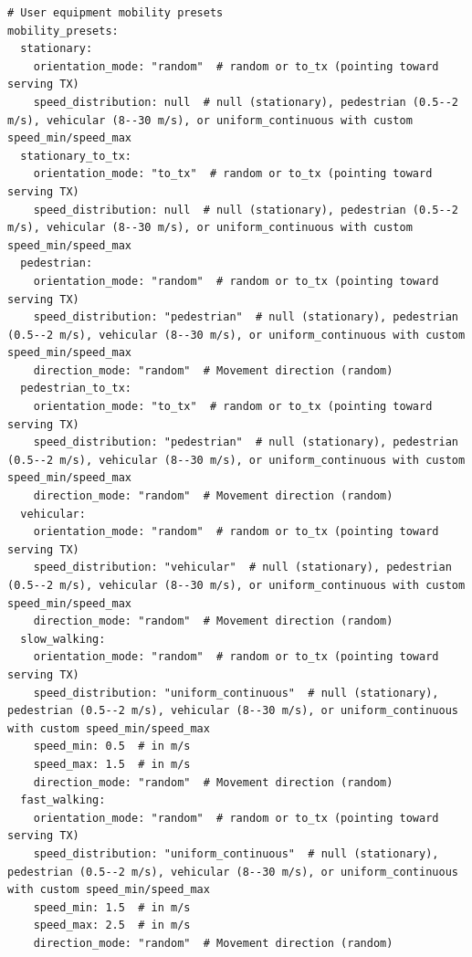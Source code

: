 \documentclass{article}
\begin{document}
\begin{verbatim}
# User equipment mobility presets
mobility_presets:
  stationary:
    orientation_mode: "random"  # random or to_tx (pointing toward serving TX)
    speed_distribution: null  # null (stationary), pedestrian (0.5--2 m/s), vehicular (8--30 m/s), or uniform_continuous with custom speed_min/speed_max
  stationary_to_tx:
    orientation_mode: "to_tx"  # random or to_tx (pointing toward serving TX)
    speed_distribution: null  # null (stationary), pedestrian (0.5--2 m/s), vehicular (8--30 m/s), or uniform_continuous with custom speed_min/speed_max
  pedestrian:
    orientation_mode: "random"  # random or to_tx (pointing toward serving TX)
    speed_distribution: "pedestrian"  # null (stationary), pedestrian (0.5--2 m/s), vehicular (8--30 m/s), or uniform_continuous with custom speed_min/speed_max
    direction_mode: "random"  # Movement direction (random)
  pedestrian_to_tx:
    orientation_mode: "to_tx"  # random or to_tx (pointing toward serving TX)
    speed_distribution: "pedestrian"  # null (stationary), pedestrian (0.5--2 m/s), vehicular (8--30 m/s), or uniform_continuous with custom speed_min/speed_max
    direction_mode: "random"  # Movement direction (random)
  vehicular:
    orientation_mode: "random"  # random or to_tx (pointing toward serving TX)
    speed_distribution: "vehicular"  # null (stationary), pedestrian (0.5--2 m/s), vehicular (8--30 m/s), or uniform_continuous with custom speed_min/speed_max
    direction_mode: "random"  # Movement direction (random)
  slow_walking:
    orientation_mode: "random"  # random or to_tx (pointing toward serving TX)
    speed_distribution: "uniform_continuous"  # null (stationary), pedestrian (0.5--2 m/s), vehicular (8--30 m/s), or uniform_continuous with custom speed_min/speed_max
    speed_min: 0.5  # in m/s
    speed_max: 1.5  # in m/s
    direction_mode: "random"  # Movement direction (random)
  fast_walking:
    orientation_mode: "random"  # random or to_tx (pointing toward serving TX)
    speed_distribution: "uniform_continuous"  # null (stationary), pedestrian (0.5--2 m/s), vehicular (8--30 m/s), or uniform_continuous with custom speed_min/speed_max
    speed_min: 1.5  # in m/s
    speed_max: 2.5  # in m/s
    direction_mode: "random"  # Movement direction (random)


\end{verbatim}
\end{document}
